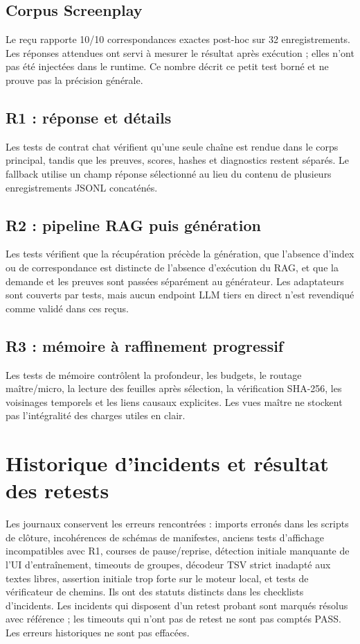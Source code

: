\documentclass[11pt,a4paper]{article}
\begin{document}
\subsection{Corpus Screenplay}
Le reçu  rapporte 10/10 correspondances exactes post-hoc sur 32 enregistrements. Les réponses attendues ont servi à mesurer le résultat après exécution ; elles n'ont pas été injectées dans le runtime. Ce nombre décrit ce petit test borné et ne prouve pas la précision générale.

\subsection{R1 : réponse et détails}
Les tests de contrat chat vérifient qu'une seule chaîne est rendue dans le corps principal, tandis que les preuves, scores, hashes et diagnostics restent séparés. Le fallback utilise un champ réponse sélectionné au lieu du contenu de plusieurs enregistrements JSONL concaténés.

\subsection{R2 : pipeline RAG puis génération}
Les tests vérifient que la récupération précède la génération, que l'absence d'index ou de correspondance est distincte de l'absence d'exécution du RAG, et que la demande et les preuves sont passées séparément au générateur. Les adaptateurs sont couverts par tests, mais aucun endpoint LLM tiers en direct n'est revendiqué comme validé dans ces reçus.

\subsection{R3 : mémoire à raffinement progressif}
Les tests de mémoire contrôlent la profondeur, les budgets, le routage maître/micro, la lecture des feuilles après sélection, la vérification SHA-256, les voisinages temporels et les liens causaux explicites. Les vues maître ne stockent pas l'intégralité des charges utiles en clair.

\section{Historique d'incidents et résultat des retests}
Les journaux conservent les erreurs rencontrées : imports erronés dans les scripts de clôture, incohérences de schémas de manifestes, anciens tests d'affichage incompatibles avec R1, courses de pause/reprise, détection initiale manquante de l'UI d'entraînement, timeouts de groupes, décodeur TSV strict inadapté aux textes libres, assertion initiale trop forte sur le moteur local, et tests de vérificateur de chemins. Ils ont des statuts distincts dans les checklists d'incidents. Les incidents qui disposent d'un retest probant sont marqués résolus avec référence ; les timeouts qui n'ont pas de retest ne sont pas comptés PASS. Les erreurs historiques ne sont pas effacées.
\end{document}
